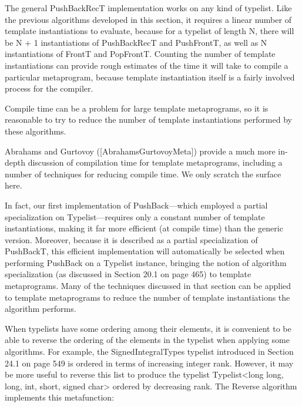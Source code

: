 The general PushBackRecT implementation works on any kind of typelist. Like the previous algorithms developed in this section, it requires a linear number of template instantiations to evaluate, because for a typelist of length N, there will be N + 1 instantiations of PushBackRecT and PushFrontT, as well as N instantiations of FrontT and PopFrontT. Counting the number of template instantiations can provide rough estimates of the time it will take to compile a particular metaprogram, because template instantiation itself is a fairly involved process for the compiler.

Compile time can be a problem for large template metaprograms, so it is reasonable to try to reduce the number of template instantiations performed by these algorithms.

\begin{tcolorbox}[colback=webgreen!5!white,colframe=webgreen!75!black]
\hspace*{0.75cm}Abrahams and Gurtovoy ([AbrahamsGurtovoyMeta]) provide a much more in-depth discussion of compilation time for template metaprograms, including a number of techniques for reducing compile time. We only scratch the surface here.
\end{tcolorbox}

In fact, our first implementation of PushBack—which employed a partial specialization on Typelist—requires only a constant number of template instantiations, making it far more efficient (at compile time) than the generic version. Moreover, because it is described as a partial specialization of PushBackT, this efficient implementation will automatically be selected when performing PushBack on a Typelist instance, bringing the notion of algorithm specialization (as discussed in Section 20.1 on page 465) to template metaprograms. Many of the techniques discussed in that section can be applied to template metaprograms to reduce the number of template instantiations the algorithm performs.


When typelists have some ordering among their elements, it is convenient to be able to reverse the ordering of the elements in the typelist when applying some algorithms. For example, the SignedIntegralTypes typelist introduced in Section 24.1 on page 549 is ordered in terms of increasing integer rank. However, it may be more useful to reverse this list to produce the typelist Typelist<long long, long, int, short, signed char> ordered by decreasing rank. The Reverse algorithm implements this metafunction:

